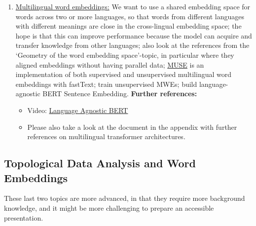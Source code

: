\documentclass[11pt, a4paper]{amsart}
\begin{document}
\begin{enumerate}[resume]
    \item \underline{Multilingual word embeddings:}
    \newline
    We want to use a shared embedding space for words across two or more languages, so that words from different languages with different meanings are close in the cross-lingual embedding space;
    the hope is that this can improve performance because the model can acquire and transfer knowledge from other languages;
    also look at the references from the `Geometry of the word embedding space'-topic, in particular \cite{DBLP:journals/corr/abs-1710-04087} where they aligned embeddings without having parallel data;
    \href{https://github.com/facebookresearch/MUSE}{MUSE} is an implementation of both supervised and unsupervised multilingual word embeddings with fastText;
    \cite{DBLP:journals/corr/abs-1808-08933} train unsupervised MWEs;
    \cite{DBLP:journals/corr/abs-2007-01852} build language-agnostic BERT Sentence Embedding.
    \newline
    \textbf{Further references:}
    \begin{itemize}
        \item Video: \href{https://youtu.be/7tAWk_Coj-s}{Language Agnostic BERT}
        \item Please also take a look at the document in the appendix with further references on multilingual transformer architectures.
    \end{itemize}
\end{enumerate}

\subsection{Topological Data Analysis and Word Embeddings}

These last two topics are more advanced, in that they require more background knowledge, and it might be more challenging to prepare an accessible presentation.
\end{document}
